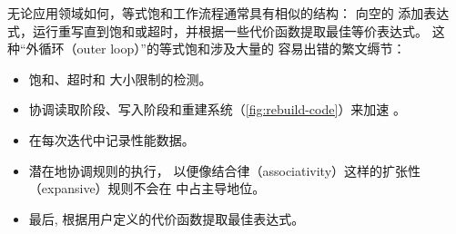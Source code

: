 无论应用领域如何，等式饱和工作流程通常具有相似的结构：
向空的 \egraph 添加表达式，运行重写直到饱和或超时，并根据一些代价函数提取最佳等价表达式。
这种“外循环（outer loop）”的等式饱和涉及大量的
  容易出错的繁文缛节：%
\begin{itemize}
  \item 饱和、超时和 \egraph 大小限制的检测。
  \item 协调读取阶段、写入阶段和重建系统（\autoref{fig:rebuild-code}）来加速 \egg 。
  \item 在每次迭代中记录性能数据。
  \item 潜在地协调规则的执行，
    以便像结合律（associativity）这样的扩张性（expansive）规则不会在 \egraph 中占主导地位。
  \item 最后, 根据用户定义的代价函数提取最佳表达式。
\end{itemize}

